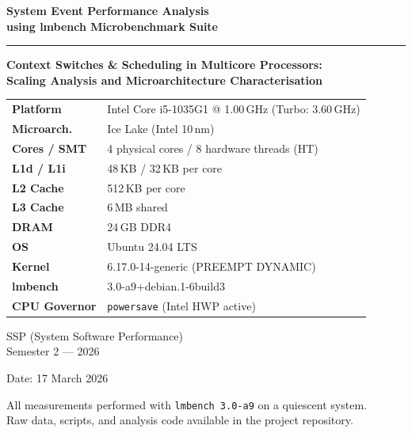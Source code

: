 \documentclass[12pt,a4paper]{article}
\begin{document}
\begin{titlepage}
\centering
\vspace*{1.5cm}

{\Huge\bfseries\color{darkblue}
    System Event Performance Analysis\\[0.4em]
    \large using lmbench Microbenchmark Suite
}

\vspace{0.5em}
{\Large\color{gray}\rule{0.7\linewidth}{1pt}}

\vspace{1.2cm}
{\large\bfseries
    Context Switches \& Scheduling in Multicore Processors:\\
    Scaling Analysis and Microarchitecture Characterisation
}

\vspace{1.5cm}
\begin{tcolorbox}[colback=lightgray, colframe=darkblue, width=0.82\linewidth,
    arc=6pt, boxrule=1pt]
\centering
\begin{tabular}{ll}
\toprule
\textbf{Platform}    & Intel Core i5-1035G1 @ 1.00\,GHz (Turbo: 3.60\,GHz) \\
\textbf{Microarch.}  & Ice Lake (Intel 10\,nm) \\
\textbf{Cores / SMT} & 4 physical cores / 8 hardware threads (HT) \\
\textbf{L1d / L1i}   & 48\,KB / 32\,KB per core \\
\textbf{L2 Cache}    & 512\,KB per core \\
\textbf{L3 Cache}    & 6\,MB shared \\
\textbf{DRAM}        & 24\,GB DDR4 \\
\textbf{OS}          & Ubuntu 24.04 LTS \\
\textbf{Kernel}      & 6.17.0-14-generic (PREEMPT DYNAMIC) \\
\textbf{lmbench}     & 3.0-a9+debian.1-6build3 \\
\textbf{CPU Governor}& \texttt{powersave} (Intel HWP active) \\
\bottomrule
\end{tabular}
\end{tcolorbox}

\vspace{1.5cm}
{\large SSP (System Software Performance)\\[0.3em]
Semester 2 — 2026}

\vspace{0.5cm}
{\normalsize Date: 17 March 2026}

\vfill
{\small\color{gray}
All measurements performed with \texttt{lmbench 3.0-a9} on a quiescent system.\\
Raw data, scripts, and analysis code available in the project repository.
}
\end{titlepage}
\end{document}
